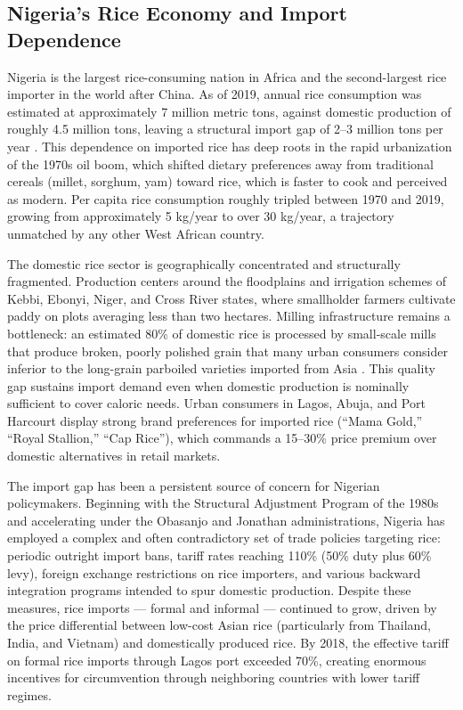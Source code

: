 \documentclass[12pt]{article}
\begin{document}
\subsection{Nigeria's Rice Economy and Import Dependence}

Nigeria is the largest rice-consuming nation in Africa and the second-largest rice importer in the world after China. As of 2019, annual rice consumption was estimated at approximately 7 million metric tons, against domestic production of roughly 4.5 million tons, leaving a structural import gap of 2--3 million tons per year \citep{calvo2019nigeria}. This dependence on imported rice has deep roots in the rapid urbanization of the 1970s oil boom, which shifted dietary preferences away from traditional cereals (millet, sorghum, yam) toward rice, which is faster to cook and perceived as modern. Per capita rice consumption roughly tripled between 1970 and 2019, growing from approximately 5 kg/year to over 30 kg/year, a trajectory unmatched by any other West African country.

The domestic rice sector is geographically concentrated and structurally fragmented. Production centers around the floodplains and irrigation schemes of Kebbi, Ebonyi, Niger, and Cross River states, where smallholder farmers cultivate paddy on plots averaging less than two hectares. Milling infrastructure remains a bottleneck: an estimated 80\% of domestic rice is processed by small-scale mills that produce broken, poorly polished grain that many urban consumers consider inferior to the long-grain parboiled varieties imported from Asia \citep{gyimah2016analysis}. This quality gap sustains import demand even when domestic production is nominally sufficient to cover caloric needs. Urban consumers in Lagos, Abuja, and Port Harcourt display strong brand preferences for imported rice (``Mama Gold,'' ``Royal Stallion,'' ``Cap Rice''), which commands a 15--30\% price premium over domestic alternatives in retail markets.

The import gap has been a persistent source of concern for Nigerian policymakers. Beginning with the Structural Adjustment Program of the 1980s and accelerating under the Obasanjo and Jonathan administrations, Nigeria has employed a complex and often contradictory set of trade policies targeting rice: periodic outright import bans, tariff rates reaching 110\% (50\% duty plus 60\% levy), foreign exchange restrictions on rice importers, and various backward integration programs intended to spur domestic production. Despite these measures, rice imports --- formal and informal --- continued to grow, driven by the price differential between low-cost Asian rice (particularly from Thailand, India, and Vietnam) and domestically produced rice. By 2018, the effective tariff on formal rice imports through Lagos port exceeded 70\%, creating enormous incentives for circumvention through neighboring countries with lower tariff regimes.
\end{document}
